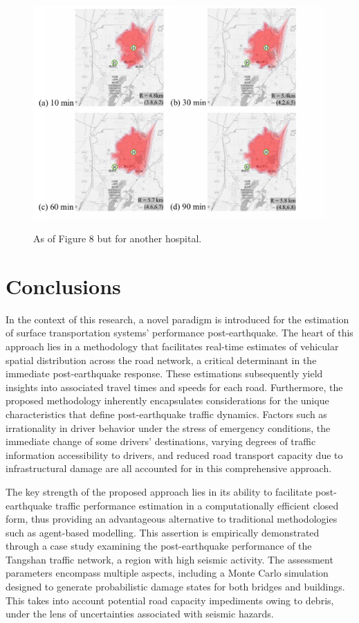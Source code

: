 \documentclass[review,11pt,nonatbib]{elsarticle}
\begin{document}
\begin{figure}[!htp]\centering
\includegraphics[width=12cm]{contour_hospital_2.pdf}\\
\caption{As of Figure 8 but for another hospital.}\label{fig9}
\end{figure}


\section{Conclusions}

In the context of this research, a novel paradigm is introduced for the estimation of surface transportation systems' performance post-earthquake. The heart of this approach lies in a methodology that facilitates real-time estimates of vehicular spatial distribution across the road network, a critical determinant in the immediate post-earthquake response. These estimations subsequently yield insights into associated travel times and speeds for each road. Furthermore, the proposed methodology inherently encapsulates considerations for the unique characteristics that define post-earthquake traffic dynamics. Factors such as irrationality in driver behavior under the stress of emergency conditions, the immediate change of some drivers' destinations, varying degrees of traffic information accessibility to drivers, and reduced road transport capacity due to infrastructural damage are all accounted for in this comprehensive approach.

The key strength of the proposed approach lies in its ability to facilitate post-earthquake traffic performance estimation in a computationally efficient closed form, thus providing an advantageous alternative to traditional methodologies such as agent-based modelling. This assertion is empirically demonstrated through a case study examining the post-earthquake performance of the Tangshan traffic network, a region with high seismic activity. The assessment parameters encompass multiple aspects, including a Monte Carlo simulation designed to generate probabilistic damage states for both bridges and buildings. This takes into account potential road capacity impediments owing to debris, under the lens of uncertainties associated with seismic hazards.
\end{document}

